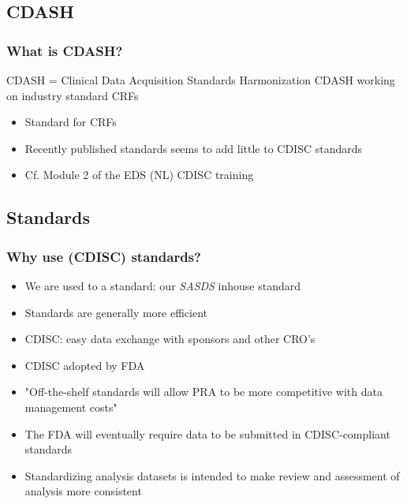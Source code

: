 \documentclass{beamer}
\begin{document}
\subsection[CDASH]{CDASH}

\begin{frame}
  \frametitle{What is CDASH?}

	\alert{CDASH} = Clinical Data Acquisition Standards Harmonization
  CDASH working on industry standard CRFs
  
  \begin{itemize}
		\item Standard for CRFs
		\item Recently published standards seems to add little to CDISC standards 
		\item Cf. Module 2 of the EDS (NL) CDISC training
  \end{itemize}
\end{frame}


\subsection[Standards]{Standards}

\begin{frame}
  \frametitle{Why use (CDISC) standards?}

  \begin{itemize}
		\item We are used to a standard: our \emph{SASDS} inhouse standard
		\item Standards are generally more efficient
		\item CDISC: easy data exchange with sponsors and other CRO's
		\item CDISC adopted by FDA
		\item "Off-the-shelf standards will allow PRA to be more competitive with data management costs"
		\item The FDA will eventually \alert{require} data to be submitted in CDISC-compliant standards
		\item Standardizing analysis datasets is intended to make review and assessment of analysis more consistent
  \end{itemize}
\end{frame}
\end{document}
